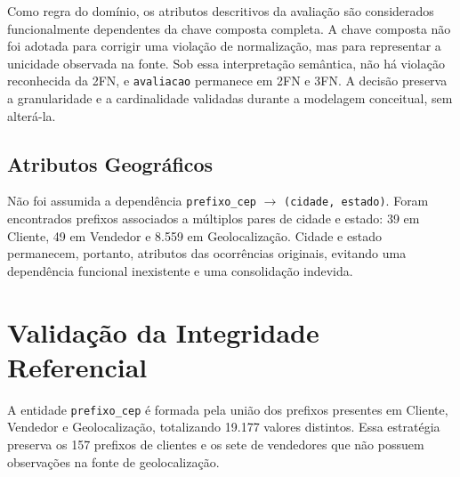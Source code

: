 \documentclass[12pt,a4paper]{article}
\begin{document}
	Como regra do domínio, os atributos descritivos da avaliação são considerados
	funcionalmente dependentes da chave composta completa. A chave composta não foi
	adotada para corrigir uma violação de normalização, mas para representar a
	unicidade observada na fonte. Sob essa interpretação semântica, não há violação
	reconhecida da 2FN, e \texttt{avaliacao} permanece em 2FN e 3FN. A decisão
	preserva a granularidade e a cardinalidade validadas durante a modelagem
	conceitual, sem alterá-la.

	\subsection{Atributos Geográficos}

	Não foi assumida a dependência \texttt{prefixo\_cep} $\rightarrow$
	\texttt{(cidade, estado)}. Foram encontrados prefixos associados a múltiplos
	pares de cidade e estado: 39 em Cliente, 49 em Vendedor e 8.559 em
	Geolocalização. Cidade e estado permanecem, portanto, atributos das ocorrências
	originais, evitando uma dependência funcional inexistente e uma consolidação
	indevida.

	\section{Validação da Integridade Referencial}

	A entidade \texttt{prefixo\_cep} é formada pela união dos prefixos presentes em
	Cliente, Vendedor e Geolocalização, totalizando 19.177 valores distintos. Essa
	estratégia preserva os 157 prefixos de clientes e os sete de vendedores que não
	possuem observações na fonte de geolocalização.
\end{document}
